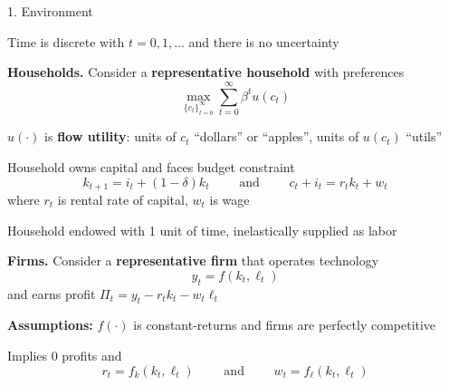 \documentclass[11pt, aspectratio=169]{beamer}
\newenvironment{witemize}{\itemize\addtolength{\itemsep}{10pt}}{\enditemize}
\begin{document}
\begin{frame}{1. Environment}

\begin{witemize}
\item Time is discrete with $t = 0, 1, \ldots$ and there is no uncertainty
\end{witemize}

\vspace{4mm}
\textbf{Households.} Consider a \textbf{representative household} with preferences
\begin{equation*}
	\max_{ \{ c_t \}_{t=0}^\infty } \sum_{t = 0}^\infty \beta^t u(c_t)
\end{equation*}

\begin{witemize}
\item $u(\cdot)$ is \textbf{flow utility}: units of $c_t$ ``dollars'' or ``apples'', units of $u(c_t)$ ``utils''

\item Household owns capital and faces budget constraint
\begin{equation*}
	k_{t+1} = i_t + (1 - \delta) k_t 
	\quad\quad \text{ and } \quad\quad
	c_t + i_t = r_t k_t + w_t
\end{equation*}
where $r_t$ is rental rate of capital, $w_t$ is wage

\item Household endowed with 1 unit of time, inelastically supplied as labor

\end{witemize}
\end{frame}



\begin{frame}{}

\vspace{4mm}
\textbf{Firms.} Consider a \textbf{representative firm} that operates technology 
\begin{equation*}
	y_t = f(k_t, \ell_t)
\end{equation*}
and earns profit $\Pi_t = y_t - r_t k_t - w_t \ell_t$ 

\vspace{5mm}
\begin{witemize}
\item \textbf{Assumptions:} $f(\cdot)$ is constant-returns and firms are perfectly competitive

\item Implies 0 profits and 
\begin{equation*}
	r_t = f_k(k_t, \ell_t) 
	\quad\quad \text{ and } \quad\quad
	w_t = f_\ell(k_t, \ell_t)
\end{equation*}

\end{witemize}
\end{frame}
\end{document}
